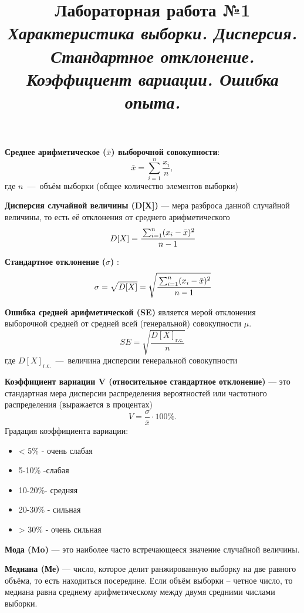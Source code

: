 \documentclass[14pt,a4paper]{article}
\title{Лабораторная работа №1 \\ \textit{Характеристика выборки. Дисперсия. Стандартное отклонение. Коэффициент вариации. Ошибка опыта.}}
\begin{document}
\maketitle
\textbf{Среднее арифметическое ($\bar{x}$) выборочной совокупности}:
\begin{equation}
    \bar{x} = \sum\limits^n_{i=1}\frac{x_i}{n},
\end{equation}
где $n$~---~объём выборки (общее количество элементов выборки)

\textbf{Дисперсия случайной величины (D[X])} — мера разброса данной случайной величины, то есть её отклонения от среднего арифметического
\begin{equation}
    D[X] =\cfrac{\sum_{i=1}^n(x_i-\bar{x})^2}{n-1}
\end{equation}

\textbf{Стандартное отклонение ($\sigma$)} :
\begin{equation}
    \sigma = \sqrt{D[X]}  = \sqrt{\cfrac{\sum_{i=1}^n(x_i-\bar{x})^2}{n-1}}
\end{equation}

\textbf{Ошибка средней арифметической (SE)} является мерой отклонения выборочной средней от средней всей (генеральной) совокупности $\mu$.
\begin{equation}
    SE = \sqrt{\frac{D[X]_\text{г.с.}}{n}}
\end{equation}
где $D[X]_\text{г.с.}$~---~величина дисперсии генеральной совокупности

\textbf{Коэффициент вариации V (относительное стандартное отклонение)} — это стандартная мера дисперсии распределения вероятностей или частотного распределения (выражается в процентах)
\begin{equation}
    V = \frac{\sigma}{\bar{x}}\cdot 100\%.
\end{equation}
Градация коэффициента вариации:
\begin{itemize}
    \item < 5\% - очень слабая
    \item 5-10\% -слабая
    \item 10-20\%- средняя
    \item 20-30\% - сильная
    \item > 30\% - очень сильная
\end{itemize}

\textbf{Мода (Mo)} — это наиболее часто встречающееся значение случайной величины.

\textbf{Медиана (Ме)} — число, которое делит ранжированную выборку на две равного объёма, то есть находиться посередине. Если объём выборки – четное число, то медиана равна среднему арифметическому между двумя средними числами выборки.
\end{document}
